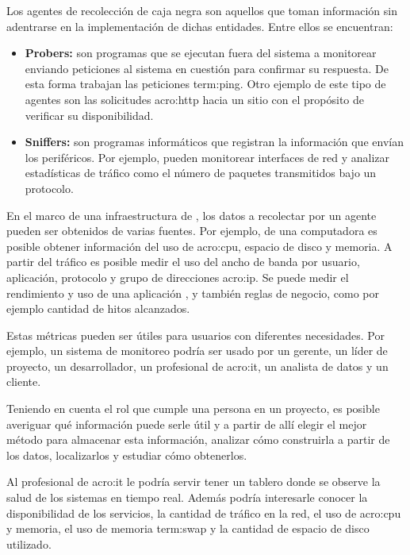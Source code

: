 Los agentes de recolección de caja negra son aquellos que toman información sin
adentrarse en la implementación de dichas entidades. Entre ellos se encuentran:

\begin{itemize}
  \item \textbf{Probers:} son programas que se ejecutan fuera del sistema a
    monitorear enviando peticiones al sistema en cuestión para confirmar su
    respuesta. De esta forma trabajan las peticiones \gls{term:ping}. Otro
    ejemplo de este tipo de agentes son las solicitudes \gls{acro:http} hacia
    un sitio  con el propósito de verificar su disponibilidad.

  \item \textbf{Sniffers:} son programas informáticos que registran la
    información que envían los periféricos. Por ejemplo, pueden monitorear
    interfaces de red y analizar estadísticas de tráfico como el número de
    paquetes transmitidos bajo un protocolo.
    \cite[p.~15-16]{monitoreo:efective_monitoring_and_alerting}
\end{itemize}

En el marco de una infraestructura de , los datos a recolectar por
un agente pueden ser obtenidos de varias fuentes. Por ejemplo, de una
computadora es posible obtener información del uso de \gls{acro:cpu}, espacio
de disco y memoria. A partir del tráfico  es posible medir el uso del
ancho de banda por usuario, aplicación, protocolo y grupo de direcciones
\gls{acro:ip}. Se puede medir el rendimiento y uso de una aplicación ,
y también reglas de negocio, como por ejemplo cantidad de hitos alcanzados.

Estas métricas pueden ser útiles para usuarios con diferentes necesidades. Por
ejemplo, un sistema de monitoreo podría ser usado por un gerente, un líder de
proyecto, un desarrollador, un profesional de \gls{acro:it}, un analista de
datos y un cliente.

Teniendo en cuenta el rol que cumple una persona en un proyecto, es posible
averiguar qué información puede serle útil y a partir de allí elegir el mejor
método para almacenar esta información, analizar cómo construirla a partir de
los datos, localizarlos y estudiar cómo obtenerlos.

Al profesional de \gls{acro:it} le podría servir tener un tablero donde se
observe la salud de los sistemas en tiempo real. Además podría interesarle
conocer la disponibilidad de los servicios, la cantidad de tráfico en la red,
el uso de \gls{acro:cpu} y memoria, el uso de memoria \gls{term:swap} y la
cantidad de espacio de disco utilizado.

